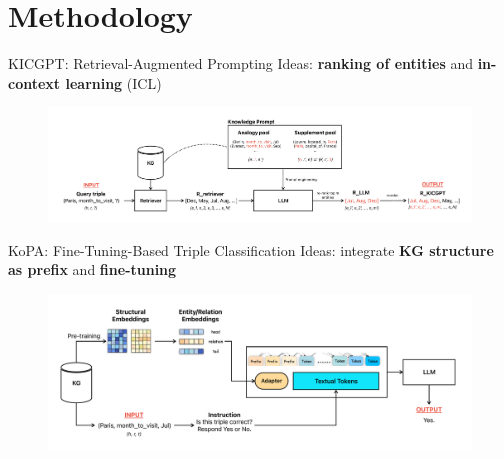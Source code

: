 \documentclass[aspectratio=169,xcolor=dvipsnames]{beamer}
\begin{document}
\section{Methodology}
\begin{frame}{KICGPT: Retrieval-Augmented Prompting}
    Ideas: \textbf{ranking of entities} and \textbf{in-context learning} (ICL)
    \begin{figure}[h]
        \centering
        \includegraphics[width=1.02\linewidth]{images/KICGPT.pdf}
    \end{figure}
\end{frame}


\begin{frame}{KoPA: Fine-Tuning-Based Triple Classification}
    Ideas: integrate \textbf{KG structure as prefix} and \textbf{fine-tuning}
    \begin{figure}[h]
        \centering
        \includegraphics[width=1\linewidth]{images/KoPA.pdf}
    \end{figure}
\end{frame}
\end{document}
